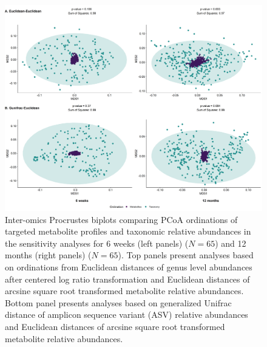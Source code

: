\begin{figure}[!h]
    \centering
    \includegraphics[width=0.95\linewidth]{figures/appB_fs5.png}
    \caption[Inter-omics Procrustes biplots comparing PCoA ordinations of targeted metabolite profiles and taxonomic relative abundances in the sensitivity analyses for 6 weeks (left panels) ($N = 65$) and 12 months (right panels) ($N = 65$)]{Inter-omics Procrustes biplots comparing PCoA ordinations of targeted metabolite profiles and taxonomic relative abundances in the sensitivity analyses for 6 weeks (left panels) ($N = 65$) and 12 months (right panels) ($N = 65$). Top panels present analyses based on ordinations from Euclidean distances of genus level abundances after centered log ratio transformation and Euclidean distances of arcsine square root transformed metabolite relative abundances. Bottom panel presents analyses based on generalized Unifrac distance of amplicon sequence variant (ASV) relative abundances and Euclidean distances of arcsine square root transformed metabolite relative abundances.}
    \label{fig:b5}
\end{figure}

